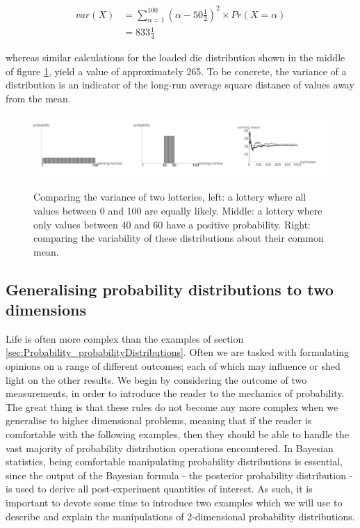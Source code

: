 \documentclass[11pt,fullpage]{book}
\begin{document}
\begin{equation}
\begin{align}
var(X) &= \sum\limits_{\alpha=1}^{100} (\alpha-50\tfrac{1}{2})^2\times Pr(X=\alpha)\\
&= 833\tfrac{1}{4}
\end{align}
\end{equation}

whereas similar calculations for the loaded die distribution shown in the middle of figure \ref{fig:Probability_varianceLottery}, yield a value of approximately 265. To be concrete, the variance of a distribution is an indicator of the long-run average square distance of values away from the mean. 

\begin{figure}
\centering
\scalebox{0.35} 
{\includegraphics{Probability_varianceLottery.pdf}}
\caption{Comparing the variance of two lotteries, left: a lottery where all values between 0 and 100 are equally likely. Middle: a lottery where only values between 40 and 60 have a positive probability. Right: comparing the variability of these distributions about their common mean.}\label{fig:Probability_varianceLottery}
\end{figure} 

\subsection{Generalising probability distributions to two dimensions}
Life is often more complex than the examples of section \ref{sec:Probability_probabilityDistributions}. Often we are tasked with formulating opinions on a range of different outcomes; each of which may influence or shed light on the other results. We begin by considering the outcome of two measurements, in order to introduce the reader to the mechanics of probability. The great thing is that these rules do not become any more complex when we generalise to higher dimensional problems, meaning that if the reader is comfortable with the following examples, then they should be able to handle the vast majority of probability distribution operations encountered. In Bayesian statistics, being comfortable manipulating probability distributions is essential, since the output of the Bayesian formula - the posterior probability distribution - is used to derive all post-experiment quantities of interest. As such, it is important to devote some time to introduce two examples which we will use to describe and explain the manipulations of 2-dimensional probability distributions.
\end{document}
